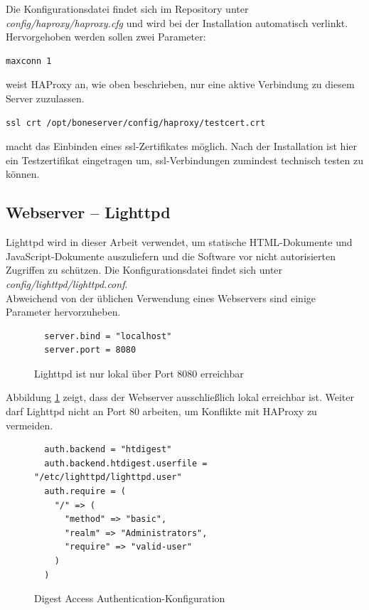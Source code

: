 Die Konfigurationsdatei findet sich im Repository unter \textit{config/haproxy/haproxy.cfg} und wird bei der Installation automatisch verlinkt.
Hervorgehoben werden sollen zwei Parameter:

\begin{lstlisting}
maxconn 1
\end{lstlisting}
weist HAProxy an, wie oben beschrieben, nur eine aktive Verbindung zu diesem Server zuzulassen.

\begin{lstlisting}
ssl crt /opt/boneserver/config/haproxy/testcert.crt
\end{lstlisting}
macht das Einbinden eines \gls{ssl}-Zertifikates möglich. Nach der Installation ist hier ein Testzertifikat eingetragen um, \gls{ssl}-Verbindungen zumindest technisch testen zu können.


\subsection{Webserver -- Lighttpd}
\label{subsec:Lighttpd}
Lighttpd wird in dieser Arbeit verwendet, um statische HTML-Dokumente und JavaScript-Dokumente auszuliefern und die Software vor nicht autorisierten Zugriffen zu schützen. Die Konfigurationsdatei findet sich unter \textit{config/lighttpd/lighttpd.conf}.\\

Abweichend von der üblichen Verwendung eines Webservers sind einige Parameter hervorzuheben.

\begin{figure}[ht]
  \begin{lstlisting}
  server.bind = "localhost"
  server.port = 8080
  \end{lstlisting}
  \caption{Lighttpd ist nur lokal über Port 8080 erreichbar}
  \label{lst:lighttpdLocal}
\end{figure}

Abbildung \ref{lst:lighttpdLocal} zeigt, dass der Webserver ausschließlich lokal erreichbar ist. Weiter darf Lighttpd nicht an Port 80 arbeiten, um Konflikte mit HAProxy zu vermeiden.\\

\begin{figure}[ht]
  \begin{lstlisting}
  auth.backend = "htdigest"
  auth.backend.htdigest.userfile = "/etc/lighttpd/lighttpd.user"
  auth.require = (
    "/" => (
      "method" => "basic",
      "realm" => "Administrators",
      "require" => "valid-user"
    )
  )
  \end{lstlisting}
  \caption{Digest Access Authentication-Konfiguration}
  \label{lst:lighttpdhtdigest}
\end{figure}

